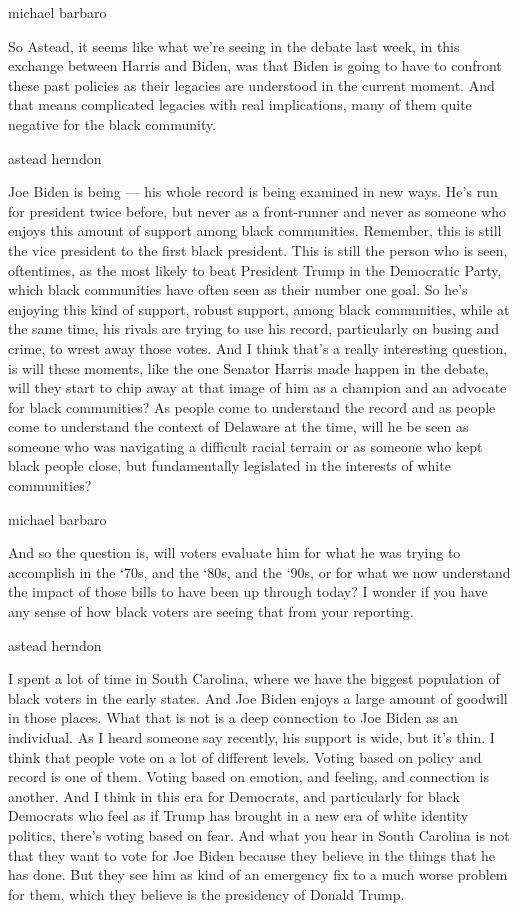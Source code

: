 michael barbaro

So Astead, it seems like what we're seeing in the debate last week, in
this exchange between Harris and Biden, was that Biden is going to have
to confront these past policies as their legacies are understood in the
current moment. And that means complicated legacies with real
implications, many of them quite negative for the black community.

astead herndon

Joe Biden is being --- his whole record is being examined in new ways.
He's run for president twice before, but never as a front-runner and
never as someone who enjoys this amount of support among black
communities. Remember, this is still the vice president to the first
black president. This is still the person who is seen, oftentimes, as
the most likely to beat President Trump in the Democratic Party, which
black communities have often seen as their number one goal. So he's
enjoying this kind of support, robust support, among black communities,
while at the same time, his rivals are trying to use his record,
particularly on busing and crime, to wrest away those votes. And I think
that's a really interesting question, is will these moments, like the
one Senator Harris made happen in the debate, will they start to chip
away at that image of him as a champion and an advocate for black
communities? As people come to understand the record and as people come
to understand the context of Delaware at the time, will he be seen as
someone who was navigating a difficult racial terrain or as someone who
kept black people close, but fundamentally legislated in the interests
of white communities?

michael barbaro

And so the question is, will voters evaluate him for what he was trying
to accomplish in the `70s, and the `80s, and the `90s, or for what we
now understand the impact of those bills to have been up through today?
I wonder if you have any sense of how black voters are seeing that from
your reporting.

astead herndon

I spent a lot of time in South Carolina, where we have the biggest
population of black voters in the early states. And Joe Biden enjoys a
large amount of goodwill in those places. What that is not is a deep
connection to Joe Biden as an individual. As I heard someone say
recently, his support is wide, but it's thin. I think that people vote
on a lot of different levels. Voting based on policy and record is one
of them. Voting based on emotion, and feeling, and connection is
another. And I think in this era for Democrats, and particularly for
black Democrats who feel as if Trump has brought in a new era of white
identity politics, there's voting based on fear. And what you hear in
South Carolina is not that they want to vote for Joe Biden because they
believe in the things that he has done. But they see him as kind of an
emergency fix to a much worse problem for them, which they believe is
the presidency of Donald Trump.

